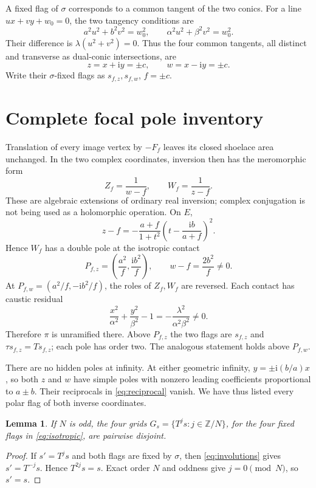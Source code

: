 \documentclass[11pt]{article}
\newtheorem{lemma}{Lemma}
\newcommand{\ii}{\mathrm i}
\begin{document}
A fixed flag of \(\sigma\) corresponds to a common tangent of the two
conics. For a line \(ux+vy+w_0=0\), the two tangency conditions are
\[
 a^2u^2+b^2v^2=w_0^2,\qquad
 \alpha^2u^2+\beta^2v^2=w_0^2.
\]
Their difference is \(\lambda(u^2+v^2)=0\). Thus the four common
tangents, all distinct and transverse as dual-conic intersections, are
\begin{equation}\label{eq:isotropic}
 z=x+\ii y=\pm c,\qquad w=x-\ii y=\pm c.
\end{equation}
Write their \(\sigma\)-fixed flags as \(s_{f,z},s_{f,w}\), \(f=\pm c\).

\section{Complete focal pole inventory}

Translation of every image vertex by \(-F_f\) leaves its closed
shoelace area unchanged. In the two complex coordinates, inversion then
has the meromorphic form
\begin{equation}\label{eq:reciprocal}
 Z_f=\frac1{w-f},\qquad W_f=\frac1{z-f}.
\end{equation}
These are algebraic extensions of ordinary real inversion; complex
conjugation is not being used as a holomorphic operation.
On \(E\),
\begin{equation}\label{eq:factor}
 z-f=-\frac{a+f}{1+t^2}
       \left(t-\frac{\ii b}{a+f}\right)^2.
\end{equation}
Hence \(W_f\) has a double pole at the isotropic contact
\[
 P_{f,z}=\left(\frac{a^2}{f},\frac{\ii b^2}{f}\right),
 \qquad w-f=\frac{2b^2}{f}\ne0.
\]
At \(P_{f,w}=(a^2/f,-\ii b^2/f)\), the roles of \(Z_f,W_f\) are
reversed. Each contact has caustic residual
\[
 \frac{x^2}{\alpha^2}+\frac{y^2}{\beta^2}-1
 =-\frac{\lambda^2}{\alpha^2\beta^2}\ne0.
\]
Therefore \(\pi\) is unramified there. Above \(P_{f,z}\) the two flags
are \(s_{f,z}\) and \(\tau s_{f,z}=Ts_{f,z}\); each pole has order two.
The analogous statement holds above \(P_{f,w}\).

There are no hidden poles at infinity. At either geometric infinity,
\(y=\pm\ii(b/a)x\), so both \(z\) and \(w\) have simple poles with
nonzero leading coefficients proportional to \(a\pm b\).
Their reciprocals in \eqref{eq:reciprocal} vanish. We have thus listed
every polar flag of both inverse coordinates.

\begin{lemma}\label{lem:grids}
If \(N\) is odd, the four grids
\(G_s=\{T^js:j\in\mathbb Z/N\}\), for the four fixed flags in
\eqref{eq:isotropic}, are pairwise disjoint.
\end{lemma}
\begin{proof}
If \(s'=T^js\) and both flags are fixed by \(\sigma\), then
\eqref{eq:involutions} gives \(s'=T^{-j}s\). Hence \(T^{2j}s=s\).
Exact order \(N\) and oddness give \(j=0\pmod N\), so \(s'=s\).
\end{proof}
\end{document}

